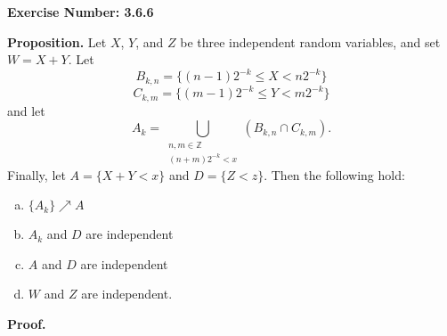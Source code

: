 \documentclass{article}
\begin{document}
\noindent \textbf{Exercise Number: 3.6.6}  %

\bigskip

\noindent \textbf{Proposition.} Let $X$, $Y$, and $Z$ be three independent random variables, and set $W = X + Y$. Let \[B_{k,n} = \{(n-1) 2^{-k} \leq X < n 2^{-k}\}\] \[C_{k,m} = \{(m-1) 2^{-k} \leq Y < m 2^{-k}\}\] and let \[A_k = \bigcup_{\substack{n,m \in \mathbb{Z} \\ (n+m)2^{-k} < x}} (B_{k,n} \cap C_{k,m}).\] Finally, let $A = \{X + Y < x\}$ and $D = \{Z < z\}$. Then the following hold:

\begin{enumerate}[(a)]

\item $\{A_k\} \nearrow A$

\item $A_k$ and $D$ are independent 

\item $A$ and $D$ are independent 

\item $W$ and $Z$ are independent.

\end{enumerate}

\medskip

\noindent \textbf{Proof.} 
\end{document}
